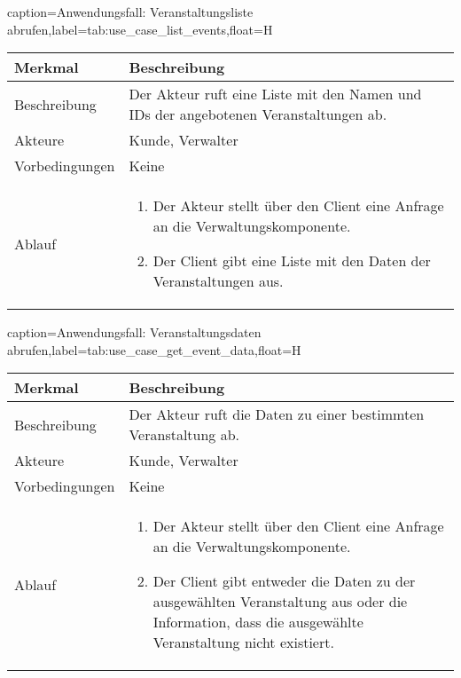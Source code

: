 \begin{dhbwtable}{caption={Anwendungsfall: Veranstaltungsliste abrufen},label=tab:use_case_list_events,float=H}
    \begin{tabularx}{\textwidth}{lX}
        \toprule
        \textbf{Merkmal} & \textbf{Beschreibung}  \\ \midrule
        Beschreibung    & Der Akteur ruft eine Liste mit den Namen und IDs der angebotenen Veranstaltungen ab. \\
        Akteure         & Kunde, Verwalter \\
        Vorbedingungen  & Keine \\
        Ablauf          & \begin{minipage}[t]{\linewidth}
        \vspace*{-3mm}
        \begin{enumerate}[leftmargin=*,nosep,after=\strut]
            \item Der Akteur stellt über den Client eine Anfrage an die Verwaltungskomponente.
            \item Der Client gibt eine Liste mit den Daten der Veranstaltungen aus.
        \end{enumerate} 
        \end{minipage} \\\bottomrule
    \end{tabularx}    
\end{dhbwtable}

\begin{dhbwtable}{caption={Anwendungsfall: Veranstaltungsdaten abrufen},label=tab:use_case_get_event_data,float=H}
    \begin{tabularx}{\textwidth}{lX}
        \toprule
        \textbf{Merkmal} & \textbf{Beschreibung}  \\ \midrule
        Beschreibung    & Der Akteur ruft die Daten zu einer bestimmten Veranstaltung ab. \\
        Akteure         & Kunde, Verwalter \\
        Vorbedingungen  & Keine \\
        Ablauf          & \begin{minipage}[t]{\linewidth}
        \vspace*{-3mm}
        \begin{enumerate}[leftmargin=*,nosep,after=\strut]
            \item Der Akteur stellt über den Client eine Anfrage an die Verwaltungskomponente.
            \item Der Client gibt entweder die Daten zu der ausgewählten Veranstaltung aus oder die Information, dass die ausgewählte Veranstaltung nicht existiert.
        \end{enumerate}
        \end{minipage} \\\bottomrule
    \end{tabularx}    
\end{dhbwtable}

